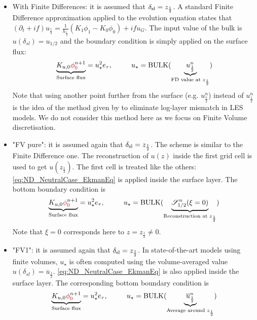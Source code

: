   \begin{itemize}
	  \item With Finite Differences:
		  it is assumed that
		  $\delta_{\rm sl} = z_{\frac{1}{2}}$.
		A standard Finite Difference approximation applied to
		  the evolution equation states that
		  $(\partial_t+if) u_{\frac{1}{2}}
		  =\frac{1}{h_{\frac{1}{2}}}(K_1\phi_1 - K_0\phi_0)
		  + if u_G$.
		  The input value of the bulk is
		  $u(\delta_{sl}) = u_{1/2}$ and the boundary
		  condition is simply applied on the surface flux:
		\begin{equation}
			\underbrace{K_{u,0}
			\emphase{\phi}^{n+1}_\emphase{0}}_{\text{Surface flux}}
		= u_\star^2 e_\tau, ~~~~~~~~
			u_\star = {\rm BULK}(
			\underbrace{u_{\frac{1}{2}}^{n}}_{
				\text{FD value at }
			z_{\frac{1}{2}}})
		\end{equation}
		  Note that using another point further from
		  the surface (e.g. $u_{\frac{7}{2}}^n$) instead
		  of $u_{\frac{1}{2}}^n$ is the idea of the method
		  given by \citep{kawai_wall-modeling_2012}
		  to eliminate log-layer mismatch in LES models.
		  We do not consider this method here as we focus
		  on Finite Volume discretisation.
	  \item "FV pure": it is assumed again that
		  $\delta_{\rm sl} = z_{\frac{1}{2}}$.
		  The scheme is similar to the Finite Difference one.
	    The reconstruction of $u(z)$ inside the first grid cell
		  is used to get $u(z_{\frac{1}{2}})$.
		  The first cell is treated like the others:
		  \eqref{eq:ND_NeutralCase_EkmanEq} is
		  applied inside the surface layer.
	The bottom boundary condition is
	\begin{equation}
		\underbrace{K_{u,0} \emphase{\phi}^{n+1}_\emphase{0}}_{\text{Surface flux}}
		= u_\star^2 e_\tau, ~~~~~~~~
			u_\star = {\rm BULK}(
			\underbrace{{\cal S}_{1/2}^{n}(\xi=0)}_{
				\text{Reconstruction at }
			z_{\frac{1}{2}}})
	\end{equation}
		  Note that $\xi=0$ corresponds here
		  to $z=z_{\frac{1}{2}}\neq 0$.
	  \item "FV1": it is assumed again that
		  $\delta_{\rm sl} = z_{\frac{1}{2}}$.
		  In state-of-the-art models using finite volumes,
		  $u_{\star}$ is often computed using the
		  volume-averaged value
		  $u(\delta_{sl}) = \overline{u}_{\frac{1}{2}}$.
		  \eqref{eq:ND_NeutralCase_EkmanEq} is
		  also applied inside the surface layer.
		The corresponding bottom boundary condition is
		  \begin{equation}
		\underbrace{K_{u,0} \emphase{\phi}^{n+1}_\emphase{0}}_{\text{Surface flux}}
		= u_\star^2 e_\tau, ~~~~~~~~
			u_\star = {\rm BULK}(
			\underbrace{\overline{u}^{n}_{\frac{1}{2}}}_{
				\text{Average around }
			z_{\frac{1}{2}}})
		  \end{equation}
\end{itemize}
